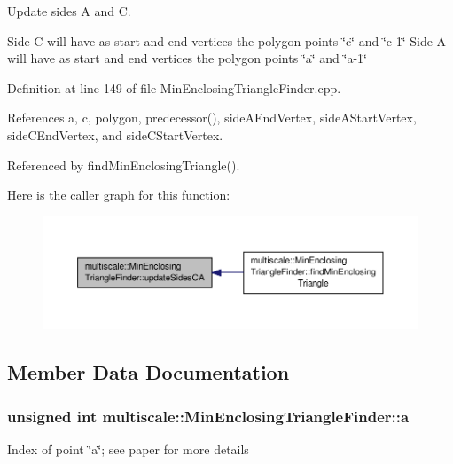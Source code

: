 Update sides A and C. 

Side C will have as start and end vertices the polygon points \char`\"{}c\char`\"{} and \char`\"{}c-\/1\char`\"{} Side A will have as start and end vertices the polygon points \char`\"{}a\char`\"{} and \char`\"{}a-\/1\char`\"{} 

Definition at line 149 of file Min\-Enclosing\-Triangle\-Finder.\-cpp.



References a, c, polygon, predecessor(), side\-A\-End\-Vertex, side\-A\-Start\-Vertex, side\-C\-End\-Vertex, and side\-C\-Start\-Vertex.



Referenced by find\-Min\-Enclosing\-Triangle().



Here is the caller graph for this function\-:\nopagebreak
\begin{figure}[H]
\begin{center}
\leavevmode
\includegraphics[width=350pt]{classmultiscale_1_1MinEnclosingTriangleFinder_a0f4a9131f5118fa0afc33344bdf67f16_icgraph}
\end{center}
\end{figure}




\subsection{Member Data Documentation}
\hypertarget{classmultiscale_1_1MinEnclosingTriangleFinder_acb13371219bdd9b7c57131f1535e4c89}{
\subsubsection[{a}]{\setlength{\rightskip}{0pt plus 5cm}unsigned int multiscale\-::\-Min\-Enclosing\-Triangle\-Finder\-::a\hspace{0.3cm}{\ttfamily [private]}}}\label{classmultiscale_1_1MinEnclosingTriangleFinder_acb13371219bdd9b7c57131f1535e4c89}
Index of point \char`\"{}a\char`\"{}; see paper for more details 

